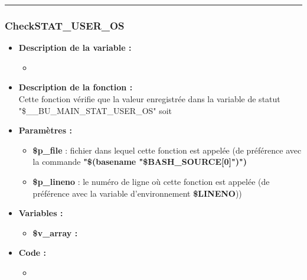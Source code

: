 \documentclass[a4paper,10pt]{article}
\begin{document}
\color{blue}\par\noindent\rule{\textwidth}{0.4pt}\color{white}

\color{blue}
\subsubsection{CheckSTAT\_USER\_OS}\color{white}

\begin{itemize}
    \item \textbf{Description de la variable :}
    \begin{itemize}
        \item \textbf{}\\[1\baselineskip]
    \end{itemize}

    \item \textbf{Description de la fonction :}\\
    Cette fonction vérifie que la valeur enregistrée dans la variable de statut "\$\_\_BU\_MAIN\_STAT\_USER\_OS" soit

    \item \textbf{Paramètres :}
    \begin{itemize}
        \item \color{orange}\textbf{\$p\_file}\color{white} : fichier dans lequel cette fonction est appelée (de préférence avec la commande \textbf{"\$(\color{gray}basename \color{white}"\color{orange}\$BASH\_SOURCE[0]\color{white}")")}\\[1\baselineskip]

        \item \color{orange}\textbf{\$p\_lineno}\color{white} : le numéro de ligne où cette fonction est appelée (de préférence avec la variable d'environnement \textbf{\color{orange}\$LINENO}))\\[1\baselineskip]
    \end{itemize}

    \item \textbf{Variables :}
    \begin{itemize}
        \item \textbf{\color{orange}\$v\_array\color{white} :}\\[1\baselineskip]
    \end{itemize}

    \item \textbf{Code :}
        \begin{itemize}
        \item \textbf{}\\[1\baselineskip]
    \end{itemize}

\end{itemize}
\end{document}
